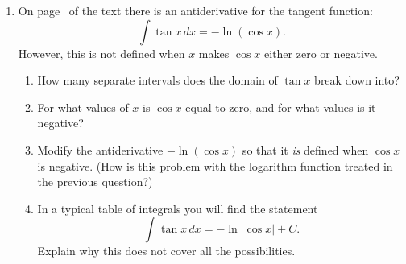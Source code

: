 \begin{enumerate}
\begin{enumerate}
  \item Explain why $F(x) = \ln{|x|}$.  For this reason a table of
integrals often contains the entry
	\[
\int \dfrac{1}{x} \, dx = \ln{|x|} + C.
\]


  \item Every function $\ln{|x|} + C$ is an antiderivative of $1/x$, but
there are even more.  As you will see, this can happen because the
domain of $1/x$ is broken into two parts.  Let
\[
G(x) = \begin{cases}
\ln(-x) & \mbox{if $x < 0$}, \\
\ln(x) + 1 & \mbox{if $x > 0$}.
\end{cases}
\]
Sketch together the graphs of the functions $G(x)$ and $1/x$ in such a
way that it is clear that $G(x)$ is an antiderivative of $1/x$.

  \item Explain why there is no value of $C$ for which
	\[
\ln{|x|} + C = G(x).
\]
This shows that the functions $\ln{|x|} + C$ do not exhaust the set of
antiderivatives of $1/x$.

  \item Construct two more antiderivatives of $1/x$ and sketch their
graphs.  What is the general form of the new antiderivatives you have
constructed?  (A suggestion: you should be able to use two separate
constants $C_1$ and $C_2$ to describe the general form.)


\end{enumerate}
\item On page~\pageref{tangent} of the text there is an antiderivative
for the tangent function:
	\[
\int \tan{x} \, dx = - \ln(\cos{x}).
\]
However, this is not defined when $x$ makes $\cos{x}$ either zero or
negative.

  \begin{enumerate}
  \item How many separate intervals does the domain of $\tan{x}$ break
down into?

  \item For what values of $x$ is $\cos{x}$ equal to zero, and for what
values is it negative?

  \item Modify the antiderivative $-\ln(\cos{x})$ so that it {\em is\/}
defined when $\cos{x}$ is negative.  (How is this problem with the
logarithm function treated in the previous question?)


  \item In a typical table of integrals you will find the statement
	\[
\int \tan{x} \, dx =  - \ln{|\cos{x}|} + C.
\]
Explain why this does not cover all the possibilities.


\end{enumerate}
\end{enumerate}
